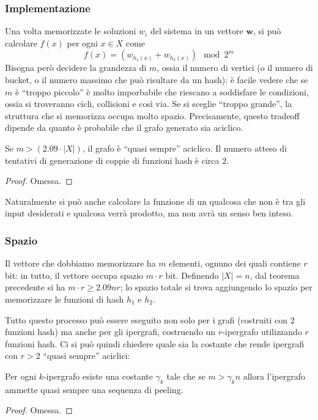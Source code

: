 \subsubsection{Implementazione}
Una volta memorizzate le soluzioni $w_i$ del sistema in un vettore $\mathbf{w}$, 
si può calcolare $f(x)$ per ogni $x \in X$ come 
$$
f(x) = (w_{h_1(x)} + w_{h_2(x)}) \mod 2^m 
$$
Bisogna però decidere la grandezza di $m$, ossia il numero di vertici (o il numero di bucket, o il numero 
massimo che può risultare da un hash): è facile vedere che se $m$ è ``troppo piccolo'' è molto imporbabile 
che riescano a soddisfare le condizioni, ossia si troveranno cicli, collisioni e così via. Se si 
sceglie ``troppo grande'', la struttura che si memorizza occupa molto spazio. 
Precisamente, questo tradeoff dipende da quanto è probabile che il grafo generato sia aciclico. 
\begin{theorem}
    Se $m > (2.09 \cdot |X|)$, il grafo è ``quasi sempre'' aciclico. Il numero atteso di tentativi 
    di generazione di coppie di funzioni hash è circa $2$.
\end{theorem}
\begin{proof}
    Omessa.
\end{proof}

Naturalmente si può anche calcolare la funzione di un qualcosa che non è tra gli input desiderati e 
qualcosa verrà prodotto, ma non avrà un senso ben inteso. 

\subsubsection{Spazio}
Il vettore che dobbiamo memorizzare ha $m$ elementi, ognuno dei quali contiene $r$ bit: in tutto, 
il vettore occupa spazio $m\cdot r$ bit. Definendo $|X| = n$, dal teorema precedente si ha 
$m\cdot r \geq 2.09nr$; lo spazio totale si trova aggiungendo lo spazio per memorizzare 
le funzioni di hash $h_1$ e $h_2$.  

Tutto questo processo può essere eseguito non solo per i grafi (costruiti con $2$ funzioni hash)
ma anche per gli ipergrafi, costruendo un $r$-ipergrafo utilizzando $r$ funzioni hash. Ci si può 
quindi chiedere quale sia la costante che rende ipergrafi con $r > 2$ ``quasi sempre'' aciclici: 
\begin{theorem}
    Per ogni $k$-ipergrafo esiste una costante $\gamma_k$ tale che se $m > \gamma_k n$ allora 
    l'ipergrafo ammette quasi sempre una sequenza di peeling. 
\end{theorem}
\begin{proof}
    Omessa.
\end{proof}

